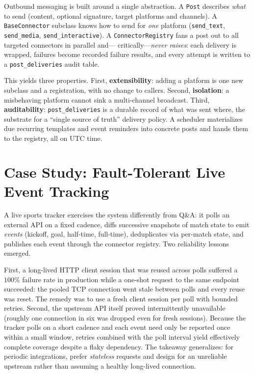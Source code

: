 \documentclass[11pt,letterpaper]{article}
\newcommand{\code}[1]{\texttt{\small #1}}
\begin{document}
Outbound messaging is built around a single abstraction. A \code{Post} describes
\emph{what} to send (content, optional signature, target platforms and channels). A
\code{BaseConnector} subclass knows how to send for \emph{one} platform
(\code{send\_text}, \code{send\_media}, \code{send\_interactive}). A
\code{ConnectorRegistry} fans a post out to all targeted connectors in parallel and---
critically---\emph{never raises}: each delivery is wrapped, failures become recorded
failure results, and every attempt is written to a \code{post\_deliveries} audit table.

This yields three properties. First, \textbf{extensibility}: adding a platform is one
new subclass and a registration, with no change to callers. Second, \textbf{isolation}:
a misbehaving platform cannot sink a multi-channel broadcast. Third,
\textbf{auditability}: \code{post\_deliveries} is a durable record of what was sent
where, the substrate for a ``single source of truth'' delivery policy. A scheduler
materializes due recurring templates and event reminders into concrete posts and hands
them to the registry, all on UTC time.

\section{Case Study: Fault-Tolerant Live Event Tracking}

A live sports tracker exercises the system differently from Q\&A: it polls an external
API on a fixed cadence, diffs successive snapshots of match state to emit
\emph{events} (kickoff, goal, half-time, full-time), deduplicates via per-match state,
and publishes each event through the connector registry. Two reliability lessons
emerged.

First, a long-lived HTTP client session that was reused across polls suffered a
$100\%$ failure rate in production while a one-shot request to the same endpoint
succeeded: the pooled TCP connection went stale between polls and every reuse was reset.
The remedy was to use a fresh client session per poll with bounded retries. Second, the
upstream API itself proved intermittently unavailable (roughly one connection in six
was dropped even for fresh sessions). Because the tracker polls on a short cadence and
each event need only be reported once within a small window, retries combined with the
poll interval yield effectively complete coverage despite a flaky dependency. The
takeaway generalizes: for periodic integrations, prefer \emph{stateless} requests and
design for an unreliable upstream rather than assuming a healthy long-lived connection.
\end{document}

